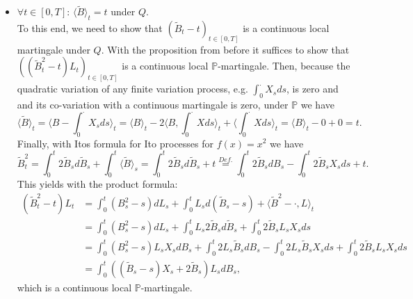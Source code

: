 \documentclass[a4paper,12pt,twoside]{article}
\begin{document}
{\begin{itemize}
        \item $\forall t \in [0,T]$: $\langle \tilde{B} \rangle_t =t$ under $Q$.\\
        To this end, we need to show that $(\tilde{B}_t -t)_{t \in [0,T]}$ is a continuous local martingale under $Q$. With the proposition from before it suffices to show that $((\tilde{B}_t^2 -t)L_t)_{t \in [0,T]}$ is a continuous local $\mathbb{P}$-martingale. Then, because the quadratic variation of any finite variation process, e.g. $ \int_0^\cdot X_s ds$, is zero and and its co-variation with a continuous martingale is zero,   under $\mathbb{P}$ we have 
        \[
        \langle \tilde{B}\rangle_t = \langle B - \int_0^\cdot X_s ds \rangle_t = \langle B \rangle_t -2 \langle B, \int_0^\cdot X ds \rangle_t+ \langle \int_0^\cdot X ds \rangle_t =  \langle B \rangle_t -0+0 =t.
        \]
        Finally, with Itos formula for Ito processes for $f(x) =x^2$ we have 
        \[
        \tilde{B}_t^2 = \int_0^t 2 \tilde{B}_s d \tilde{B}_s + \int_0^t \langle \tilde{B} \rangle_s = \int_0^t 2 \tilde{B}_s d \tilde{B}_s+ t \stackrel{Def.}{=} \int_0^t 2 \tilde{B}_s dB_s - \int_0^t 2 \tilde{B}_s X_s ds +t.
        \]
        This yields with the product formula:           
        \begin{align*}
            (\tilde{B}_t^2 -t)L_t &= \int_0^t (B_s^2 -s) dL_s   + \int_0^t L_s d(\tilde{B}_s -s) + \langle \tilde{B}^2 - \cdot,L\rangle_t \\
            &= \int_0^t (B_s^2 -s) dL_s + \int_0^t L_s 2 \tilde{B}_s d\tilde{B}_s + \int_0^t 2 \tilde{B}_s L_s X_s ds \\
            &= \int_0^t (B_s^2 -s) L_s X_s dB_s + \int_0^t 2 L_s \tilde{B}_s d B_s - \int_0^t 2 L_s \tilde{B}_s X_s ds + \int_0^t 2 \tilde{B}_s L_s X_s ds \\
            &= \int_0^t ((\tilde{B}_s -s) X_s + 2 \tilde{B}_s) L_s dB_s,
        \end{align*}
        which is a continuous local $\mathbb{P}$-martingale.
    \end{itemize}
}
\end{document}
